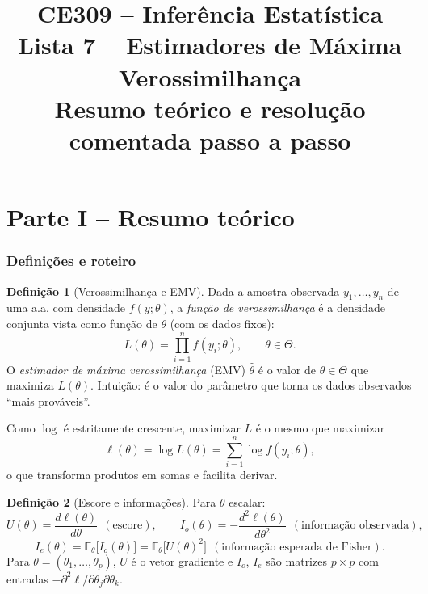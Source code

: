 \documentclass[11pt,a4paper]{article}
\title{\textbf{CE309 -- Inferência Estatística}\\[4pt]
\large Lista 7 -- Estimadores de Máxima Verossimilhança\\
Resumo teórico e resolução comentada passo a passo}
\author{}
\date{}
\newcommand{\E}{\mathbb{E}}
\theoremstyle{definition}
\newtheorem{definicao}{Definição}[section]
\theoremstyle{plain}
\begin{document}
\maketitle
\tableofcontents
\newpage

\part*{Parte I -- Resumo teórico}

\section{Definições e roteiro}

\begin{definicao}[Verossimilhança e EMV]
Dada a amostra observada $y_1,\dots,y_n$ de uma a.a. com densidade $f(y;\theta)$, a \emph{função de verossimilhança} é a densidade conjunta vista como função de $\theta$ (com os dados fixos):
\[
L(\theta)=\prod_{i=1}^nf(y_i;\theta),\qquad\theta\in\Theta .
\]
O \emph{estimador de máxima verossimilhança} (EMV) $\hat\theta$ é o valor de $\theta\in\Theta$ que maximiza $L(\theta)$. Intuição: é o valor do parâmetro que torna os dados observados ``mais prováveis''.
\end{definicao}

Como $\log$ é estritamente crescente, maximizar $L$ é o mesmo que maximizar
\[
\ell(\theta)=\log L(\theta)=\sum_{i=1}^n\log f(y_i;\theta),
\]
o que transforma produtos em somas e facilita derivar.

\begin{definicao}[Escore e informações]
Para $\theta$ escalar:
\[
U(\theta)=\frac{d\ell(\theta)}{d\theta}\ \ (\text{escore}),\qquad
I_o(\theta)=-\frac{d^2\ell(\theta)}{d\theta^2}\ \ (\text{informação observada}),
\]
\[
I_e(\theta)=\E_\theta\big[I_o(\theta)\big]=\E_\theta\big[U(\theta)^2\big]\ \ (\text{informação esperada de Fisher}).
\]
Para $\theta=(\theta_1,\dots,\theta_p)$, $U$ é o vetor gradiente e $I_o$, $I_e$ são matrizes $p\times p$ com entradas $-\partial^2\ell/\partial\theta_j\partial\theta_k$.
\end{definicao}
\end{document}
